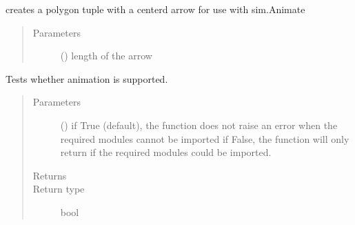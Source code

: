 \documentclass[letterpaper,10pt,english]{sphinxmanual}
\begin{document}
\begin{fulllineitems}
\label{\detokenize{Reference:salabim.arrow_polygon}}
creates a polygon tuple with a centerd arrow for use with sim.Animate
\begin{quote}\begin{description}
\item[{Parameters}] \leavevmode
{} () \textendash{} length of the arrow

\end{description}\end{quote}

\end{fulllineitems}


\begin{fulllineitems}
\label{\detokenize{Reference:salabim.can_animate}}
Tests whether animation is supported.
\begin{quote}\begin{description}
\item[{Parameters}] \leavevmode
{} () \textendash{} if True (default), the function does not raise an error when the required modules cannot be imported 
if False, the function will only return if the required modules could be imported.

\item[{Returns}] \leavevmode
{}

\item[{Return type}] \leavevmode
bool

\end{description}\end{quote}

\end{fulllineitems}

\end{document}
